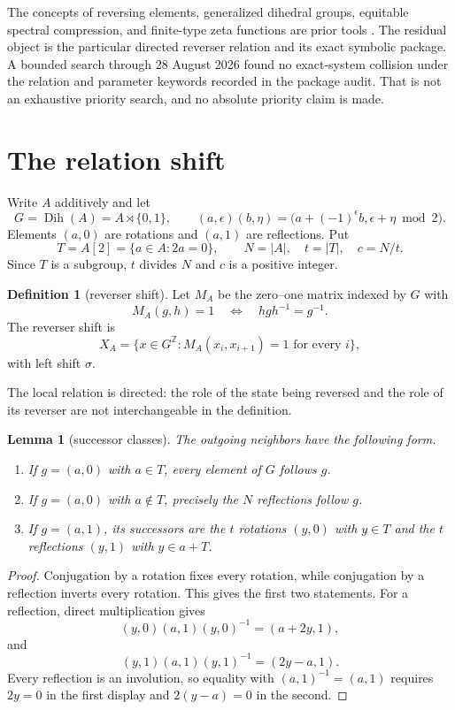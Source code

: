 \documentclass[11pt,a4paper]{amsart}
\newtheorem{lemma}[theorem]{Lemma}
\theoremstyle{definition}
\newtheorem{definition}[theorem]{Definition}
\theoremstyle{remark}
\newcommand{\Dih}{\operatorname{Dih}}
\newcommand{\Z}{\mathbb Z}
\begin{document}
The concepts of reversing elements, generalized dihedral groups, equitable
spectral compression, and finite-type zeta functions are prior tools
\cite{BaakeRoberts2006,GodsilRoyle2001,LindMarcus1995}.  The residual object is
the particular directed reverser relation and its exact symbolic package.  A
bounded search through 28 August 2026 found no exact-system collision under
the relation and parameter keywords recorded in the package audit.  That is
not an exhaustive priority search, and no absolute priority claim is made.

\section{The relation shift}

Write $A$ additively and let
\[
 G=\Dih(A)=A\rtimes\{0,1\},\qquad
 (a,\epsilon)(b,\eta)
 =\bigl(a+(-1)^\epsilon b,\epsilon+\eta\bmod2\bigr).
\]
Elements $(a,0)$ are rotations and $(a,1)$ are reflections.  Put
\[
 T=A[2]=\{a\in A:2a=0\},\qquad N=|A|,\quad t=|T|,\quad c=N/t.
\]
Since $T$ is a subgroup, $t$ divides $N$ and $c$ is a positive integer.

\begin{definition}[reverser shift]
Let $M_A$ be the zero--one matrix indexed by $G$ with
\[
 M_A(g,h)=1\quad\Longleftrightarrow\quad hgh^{-1}=g^{-1}.
\]
The reverser shift is
\[
 X_A=\{x\in G^{\Z}:M_A(x_i,x_{i+1})=1\text{ for every }i\},
\]
with left shift $\sigma$.
\end{definition}

The local relation is directed: the role of the state being reversed and the
role of its reverser are not interchangeable in the definition.

\begin{lemma}[successor classes]\label{lem:rows}
The outgoing neighbors have the following form.
\begin{enumerate}
\item If $g=(a,0)$ with $a\in T$, every element of $G$ follows $g$.
\item If $g=(a,0)$ with $a\notin T$, precisely the $N$ reflections follow
$g$.
\item If $g=(a,1)$, its successors are the $t$ rotations $(y,0)$ with
$y\in T$ and the $t$ reflections $(y,1)$ with $y\in a+T$.
\end{enumerate}
\end{lemma}

\begin{proof}
Conjugation by a rotation fixes every rotation, while conjugation by a
reflection inverts every rotation.  This gives the first two statements.
For a reflection, direct multiplication gives
\[
 (y,0)(a,1)(y,0)^{-1}=(a+2y,1),
\]
and
\[
 (y,1)(a,1)(y,1)^{-1}=(2y-a,1).
\]
Every reflection is an involution, so equality with $(a,1)^{-1}=(a,1)$
requires $2y=0$ in the first display and $2(y-a)=0$ in the second.
\end{proof}
\end{document}
